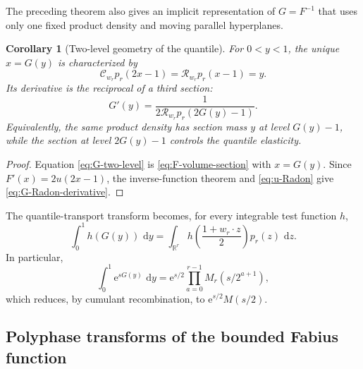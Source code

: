 \documentclass[11pt,oneside]{article}
\numberwithin{equation}{section}
\newtheorem{corollary}[theorem]{Corollary}
\theoremstyle{definition}
\theoremstyle{remark}
\newcommand{\R}{\mathbb R}
\newcommand{\dd}{\,\mathrm d}
\newcommand{\e}{\mathrm e}
\newcommand{\cC}{\mathcal C}
\newcommand{\cR}{\mathcal R}
\begin{document}
The preceding theorem also gives an implicit representation of $G=F^{-1}$ that
uses only one fixed product density and moving parallel hyperplanes.

\begin{corollary}[Two-level geometry of the quantile]
\label{cor:inverse-geometry}
For $0<y<1$, the unique $x=G(y)$ is characterized by
\begin{equation}
 \boxed{\displaystyle
 \cC_{w_r}p_r(2x-1)=\cR_{w_r}p_r(x-1)=y.}                 \label{eq:G-two-level}
\end{equation}
Its derivative is the reciprocal of a third section:
\begin{equation}
 \boxed{\displaystyle
 G'(y)=\frac1{2\cR_{w_r}p_r(2G(y)-1)}.}                   \label{eq:G-Radon-derivative}
\end{equation}
Equivalently, the same product density has section mass $y$ at level $G(y)-1$,
while the section at level $2G(y)-1$ controls the quantile elasticity.
\end{corollary}

\begin{proof}
Equation \eqref{eq:G-two-level} is \eqref{eq:F-volume-section} with $x=G(y)$.
Since $F'(x)=2u(2x-1)$, the inverse-function theorem and
\eqref{eq:u-Radon} give \eqref{eq:G-Radon-derivative}.
\end{proof}

The quantile-transport transform becomes, for every integrable test function
$h$,
\begin{equation}
 \int_0^1h(G(y))\,\dd y
 =\int_{\R^r}h\!\left(\frac{1+w_r\cdot z}{2}\right)
   p_r(z)\,\dd z.                                         \label{eq:G-product-cube}
\end{equation}
In particular,
\begin{equation}
 \int_0^1\e^{sG(y)}\,\dd y
 =\e^{s/2}\prod_{a=0}^{r-1}M_r(s/2^{a+1}),                \label{eq:G-polyphase-MGF}
\end{equation}
which reduces, by cumulant recombination, to
$\e^{s/2}M(s/2)$.

\subsection{Polyphase transforms of the bounded Fabius function}
\end{document}
